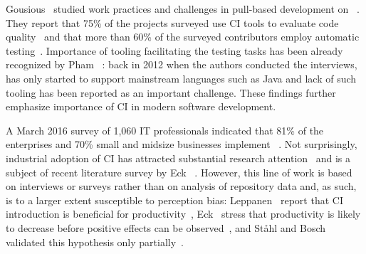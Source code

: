 
Gousious \etal\ studied work practices and challenges in pull-based
development on \GH~\cite{gousios2015work, gousios2016work}. 
They report that 75\% of the projects surveyed use CI tools to evaluate
code quality~\cite{gousios2015work} and that more than 60\% of the surveyed 
contributors employ automatic testing~\cite{gousios2016work}. 
Importance of tooling facilitating the testing tasks has been already recognized by 
Pham \etal~\cite{pham2013creating}: back in 2012 when the authors conducted
the interviews, \Tvis has only started to support mainstream languages such as Java 
and lack of such tooling has been reported as an important challenge.
These findings further emphasize importance of CI in modern software development. 

A March 2016 survey of 1,060 IT professionals indicated that 81\% of the enterprises 
and 70\% small and midsize businesses implement \DO~\cite{rightscale}. 
Not surprisingly, industrial adoption of CI 
has attracted substantial research attention~\cite{hilton2016continuous,Leppanen2015,Laukkanen2015Agile,Debbiche2014,Stahl2014ICSEComp,Stahl2014JSS,Stahl2013Experienced} and is a subject of recent literature survey by Eck \etal~\cite{EckUB14}. 
However, this line of work is based on interviews or surveys rather than on 
analysis of repository data and, as such, is to a larger extent susceptible to 
perception bias: \eg Leppanen \etal\ report that
CI introduction is beneficial for productivity~\cite{Leppanen2015}, 
Eck \etal\ stress that productivity is likely to decrease before positive effects can be observed~\cite{EckUB14},
and St{\aa}hl and Bosch validated this hypothesis only partially~\cite{Stahl2013Experienced}.
%

